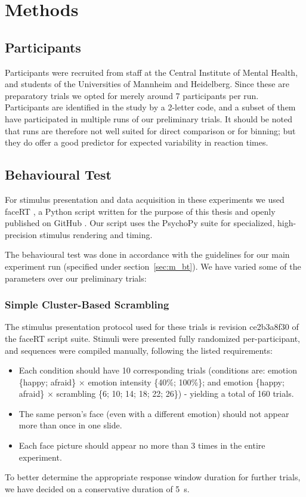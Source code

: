     \section{Methods}
	\subsection{Participants}
	    Participants were recruited from staff at the Central Institute of Mental Health, and students of the Universities of Mannheim and Heidelberg.
	    Since these are preparatory trials we opted for merely around 7 participants per run.
	    Participants are identified in the study by a 2-letter code, and a subset of them have participated in multiple runs of our preliminary trials.
	    It should be noted that runs are therefore not well suited for direct comparison or for binning; but they do offer a good predictor for expected variability in reaction times.
	\subsection{Behavioural Test}
	    For stimulus presentation and data acquisition in these experiments we used faceRT \citep{faceRT}, a Python script written for the purpose of this thesis and openly published on GitHub \citep{github}.
	    Our script uses the PsychoPy suite \citep{Peirce2008} for specialized, high-precision stimulus rendering and timing.
	    
	    The behavioural test was done in accordance with the guidelines for our main experiment run (specified under section~\ref{sec:m_bt}).
	    We have varied some of the parameters over our preliminary trials:
	    \subsubsection{Simple Cluster-Based Scrambling}
		The stimulus presentation protocol used for these trials is revision \textcolor{lg}{ce2b3a8f30} of the faceRT \citep{faceRT} script suite.
		Stimuli were presented fully randomized per-participant, and sequences were compiled manually, following the listed requirements:
		\begin{itemize}
		    \item Each condition should have 10 corresponding trials (conditions are: emotion \{happy; afraid\} $\times$ emotion intensity \{40\%; 100\%\}; and emotion \{happy; afraid\} $\times$ scrambling \{6; 10; 14; 18; 22; 26\}) - yielding a total of 160 trials.
		    \item The same person's face (even with a different emotion) should not appear more than once in one slide.
		    \item Each face picture should appear no more than 3 times in the entire experiment.
		\end{itemize}
		To better determine the appropriate response window duration for further trials, we have decided on a conservative duration of \SI{5}{\second}.
